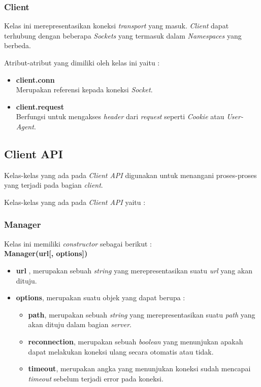 \subsubsection{Client}
Kelas ini merepresentasikan koneksi \textit{transport} yang masuk. \textit{Client} dapat terhubung dengan beberapa \textit{Sockets} yang termasuk dalam \textit{Namespaces} yang berbeda.

Atribut-atribut yang dimiliki oleh kelas ini yaitu : 

\begin{itemize}
	\item \textbf{client.conn} \\ Merupakan referensi kepada koneksi \textit{Socket}.
	\item \textbf{client.request} \\ Berfungsi untuk mengakses \textit{header} dari \textit{request} seperti \textit{Cookie} atau \textit{User-Agent}.
\end{itemize}

\subsection{Client API}
Kelas-kelas yang ada pada \textit{Client API} digunakan untuk menangani proses-proses yang terjadi pada bagian \textit{client}. 

Kelas-kelas yang ada pada \textit{Client API} yaitu : 

\subsubsection{Manager}
Kelas ini memiliki \textit{constructor} sebagai berikut : \\

\textbf{Manager(url[, options])}

\begin{itemize}
	\item \textbf{url} , merupakan sebuah \textit{string} yang merepresentasikan suatu \textit{url} yang akan dituju.
	\item \textbf{options}, merupakan suatu objek yang dapat berupa : 
		\begin{itemize}
			\item \textbf{path}, merupakan sebuah \textit{string} yang merepresentasikan suatu \textit{path} yang akan dituju dalam bagian \textit{server}.
			\item \textbf{reconnection}, merupakan sebuah \textit{boolean} yang menunjukan apakah dapat melakukan koneksi ulang secara otomatis atau tidak.
			\item \textbf{timeout}, merupakan angka yang menunjukan koneksi sudah mencapai \textit{timeout} sebelum terjadi error pada koneksi.
		\end{itemize}
\end{itemize}

